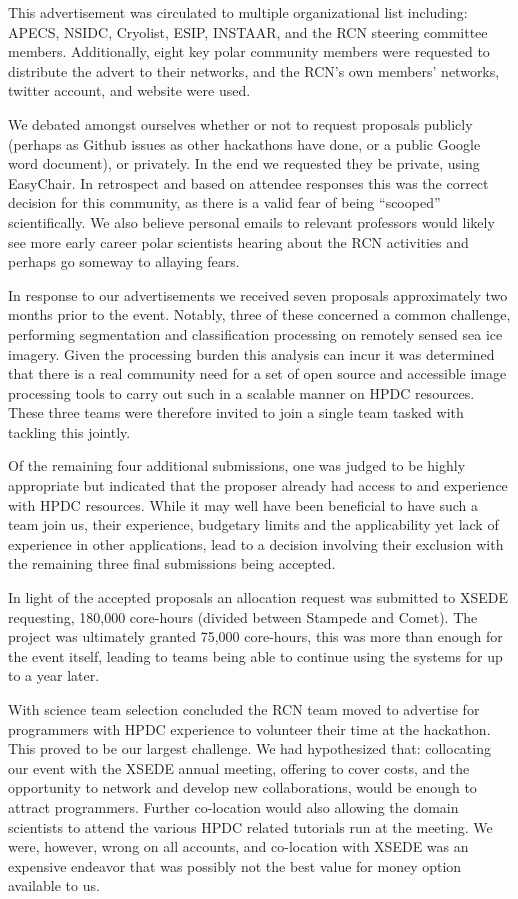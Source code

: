 \documentclass[conference]{IEEEtran}
\begin{document}
This advertisement was circulated to multiple organizational list including: APECS, NSIDC, Cryolist, ESIP, INSTAAR, and the RCN steering committee members.  Additionally, eight key polar community members were requested to distribute the advert to their networks, and the RCN's own members' networks, twitter account, and website were used.

We debated amongst ourselves whether or not to request proposals publicly (perhaps as Github issues as other hackathons have done, or a public Google word document), or privately.  In the end we requested they be private, using EasyChair.  In retrospect and based on attendee responses this was the correct decision for this community, as there is a valid fear of being ``scooped'' scientifically.  We also believe personal emails to relevant professors would likely see more early career polar scientists hearing about the RCN activities and perhaps go someway to allaying fears.


In response to our advertisements we received seven proposals approximately two months prior to the event. Notably, three of these concerned a common challenge, performing segmentation and classification processing on remotely sensed sea ice imagery. Given the processing burden this analysis can incur it was determined that there is a real community need for a set of open source and accessible image processing tools to carry out such in a scalable manner on HPDC resources.  These three teams were therefore invited to join a single team tasked with tackling this jointly.  

Of the remaining four additional submissions, one was judged to be highly appropriate but indicated that the proposer already had access to and experience with HPDC resources. While it may well have been beneficial to have such a team join us, their experience, budgetary limits and the applicability yet lack of experience in other applications, lead to a decision involving their exclusion with the remaining three final submissions being accepted.  

In light of the accepted proposals an allocation request was submitted to XSEDE requesting, 180,000 core-hours (divided between Stampede and Comet).  The project was ultimately granted 75,000 core-hours, this was more than enough for the event itself, leading to teams being able to continue using the systems for up to a year later.

With science team selection concluded the RCN team moved to advertise for programmers with HPDC experience to volunteer their time at the hackathon. This proved to be our largest challenge. We had hypothesized that: collocating our event with the XSEDE annual meeting, offering to cover costs, and the opportunity to network and develop new collaborations, would be enough to attract programmers.  Further co-location would also allowing the domain scientists to attend the various HPDC related tutorials run at the meeting.  We were, however, wrong on all accounts, and co-location with XSEDE was an expensive endeavor that was possibly not the best value for money option available to us.  
\end{document}
